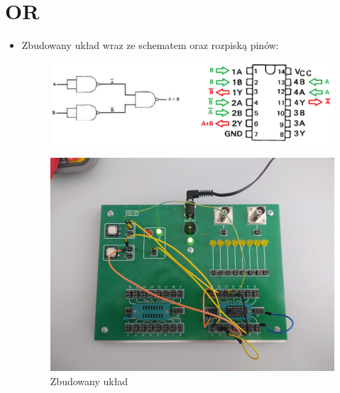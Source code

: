     \section{OR}
        \begin{itemize}
            \item Zbudowany układ wraz ze schematem oraz rozpiską pinów:
                \begin{figure}[H]
                    \centering
                    \includegraphics[width=\textwidth]{img/schemes_with_pins/NAND_or_w_pins.png}
                    \label{NAND:schemat_or_w_pins}
                \end{figure}
                \begin{figure}[H]
                    \centering
                    \includegraphics[width=\textwidth]{img/NAND/funkcje/1652306732527_scaled.png}
                    \caption{Zbudowany układ}
                    \label{NAND:zbudowany_układ_OR}
                \end{figure}
                        
            \pagebreak
            

\end{itemize}
